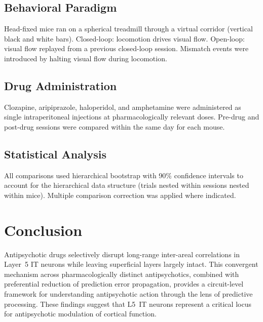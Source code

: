 \documentclass[11pt]{article}
\begin{document}
\subsection{Behavioral Paradigm}

Head-fixed mice ran on a spherical treadmill through a virtual corridor (vertical black and white bars). Closed-loop: locomotion drives visual flow. Open-loop: visual flow replayed from a previous closed-loop session. Mismatch events were introduced by halting visual flow during locomotion.

\subsection{Drug Administration}

Clozapine, aripiprazole, haloperidol, and amphetamine were administered as single intraperitoneal injections at pharmacologically relevant doses. Pre-drug and post-drug sessions were compared within the same day for each mouse.

\subsection{Statistical Analysis}

All comparisons used hierarchical bootstrap with 90\% confidence intervals \citep{efron1979bootstrap} to account for the hierarchical data structure (trials nested within sessions nested within mice). Multiple comparison correction was applied where indicated.

\section{Conclusion}

Antipsychotic drugs selectively disrupt long-range inter-areal correlations in Layer~5 IT neurons while leaving superficial layers largely intact. This convergent mechanism across pharmacologically distinct antipsychotics, combined with preferential reduction of prediction error propagation, provides a circuit-level framework for understanding antipsychotic action through the lens of predictive processing. These findings suggest that L5~IT neurons represent a critical locus for antipsychotic modulation of cortical function.



\end{document}
